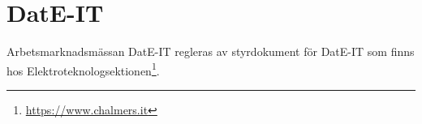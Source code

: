 \section{DatE-IT}
Arbetsmarknadsmässan DatE-IT regleras av styrdokument för DatE-IT som finns
hos Elektroteknologsektionen\footnote{\url{https://www.chalmers.it}}. 
